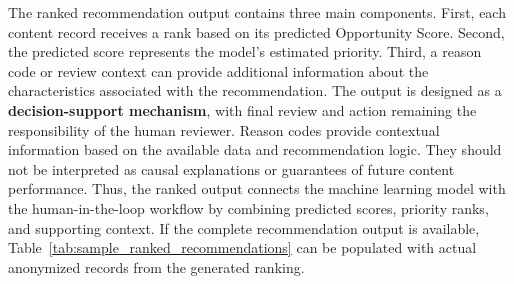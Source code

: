 \documentclass[12pt,a4paper]{report}
\begin{document}
The ranked recommendation output contains three main components. First, each content record receives a rank based on its predicted Opportunity Score. Second, the predicted score represents the model's estimated priority. Third, a reason code or review context can provide additional information about the characteristics associated with the recommendation. The output is designed as a \textbf{decision-support mechanism}, with final review and action remaining the responsibility of the human reviewer. Reason codes provide contextual information based on the available data and recommendation logic. They should not be interpreted as causal explanations or guarantees of future content performance. Thus, the ranked output connects the machine learning model with the human-in-the-loop workflow by combining predicted scores, priority ranks, and supporting context. If the complete recommendation output is available, Table~\ref{tab:sample_ranked_recommendations} can be populated with actual anonymized records from the generated ranking.
\end{document}

